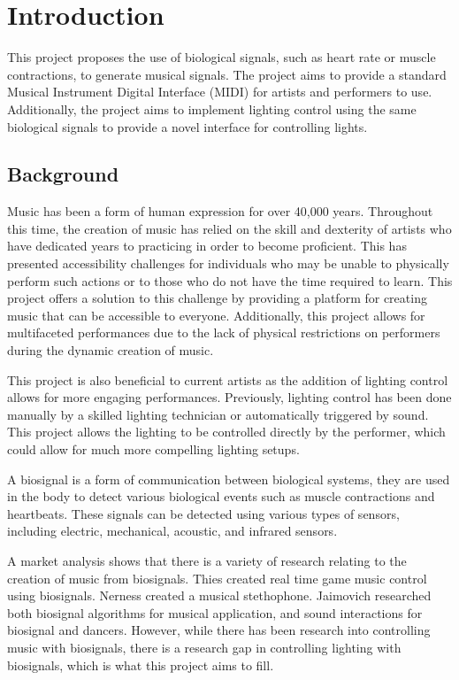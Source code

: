 \section{Introduction}
This project proposes the use of biological signals, such as heart rate or muscle contractions, to generate musical signals.
The project aims to provide a standard Musical Instrument Digital Interface (MIDI) for artists and performers to use.
Additionally, the project aims to implement lighting control using the same biological signals to provide a novel interface for controlling lights.

\subsection{Background}
Music has been a form of human expression for over 40,000 years\cite{killin:2018}.
Throughout this time, the creation of music has relied on the skill and dexterity of artists
who have dedicated years to practicing in order to become proficient.
This has presented accessibility challenges for individuals who may be unable to physically perform such actions
or to those who do not have the time required to learn.
This project offers a solution to this challenge by providing a platform for creating music that can be accessible to everyone.
Additionally, this project allows for multifaceted performances due to the lack of physical restrictions on performers
during the dynamic creation of music.

This project is also beneficial to current artists as the addition of lighting control allows for more engaging performances.
Previously, lighting control has been done manually by a skilled lighting technician or automatically triggered by sound.
This project allows the lighting to be controlled directly by the performer, which could allow for much more compelling lighting setups.


A biosignal is a form of communication between biological systems\cite{semmlow:2018},
they are used in the body to detect various biological events such as muscle contractions and heartbeats\cite{escabí:2012}.
These signals can be detected using various types of sensors, including electric, mechanical, acoustic, and infrared sensors\cite{kaniusas:2012}.

A market analysis shows that there is a variety of research relating to the creation of music from biosignals.
Thies\cite{thies:2012} created real time game music control using biosignals.
Nerness\cite{Nerness:2019} created a musical stethophone.
Jaimovich researched both biosignal algorithms for musical application\cite{jaimovich:2015},
and sound interactions for biosignal and dancers\cite{Jaimovich:2016}.
However, while there has been research into controlling music with biosignals,
there is a research gap in controlling lighting with biosignals, which is what this project aims to fill.

